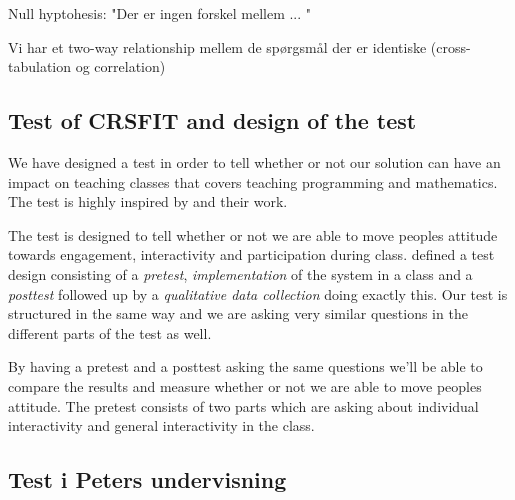 Null hyptohesis: "Der er ingen forskel mellem ... "

Vi har et two-way relationship mellem de spørgsmål der er identiske (cross-tabulation og correlation)


\subsection{Test of CRSFIT and design of the test}
We have designed a test in order to tell whether or not our solution can have an impact on teaching classes that covers teaching programming and mathematics. The test is highly inspired by \cite{siau2006use} and their work.

The test is designed to tell whether or not we are able to move peoples attitude towards engagement, interactivity and participation during class.  defined a test design consisting of a \emph{pretest}, \emph{implementation} of the system in a class and a \emph{posttest} followed up by a \emph{qualitative data collection} doing exactly this. Our test is structured in the same way and we are asking very similar questions in the different parts of the test as well.

By having a pretest and a posttest asking the same questions we'll be able to compare the results and measure whether or not we are able to move peoples attitude. The pretest consists of two parts which are asking about individual interactivity and general interactivity in the class.



\subsection{Test i Peters undervisning}

